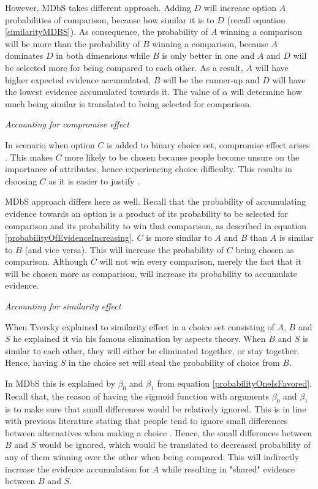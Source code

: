 \documentclass[a4paper,12pt]{article}
\newcommand{\citeyearonly}[1]{\citeyearpar{#1}}
\begin{document}
However, MDbS takes different approach. Adding $D$ will increase option $A$ probabilities of comparison, because how similar it is to $D$ (recall equation \ref{similarityMDBS}). As consequence, the probability of $A$ winning a comparison will be more than the probability of $B$ winning a comparison, because $A$ dominates $D$ in both dimensions while $B$ is only better in one and $A$ and $D$ will be selected more for being  compared to each other. As a result, $A$ will have higher expected evidence accumulated, $B$ will be the runner-up and $D$ will have the lowest evidence accumulated towards it. The value of $\alpha$ will determine how much being similar is translated to being selected for comparison.

\textit{Accounting for compromise effect}

In scenario when option $C$ is added to binary choice set, compromise effect arises \citep{simonson89}. This makes $C$ more likely to be chosen because people become unsure on the importance of attributes, hence experiencing choice difficulty. This results in choosing $C$ as it is easier to justify \citep{simonson89}. 

MDbS approach differs here as well. Recall that the probability of accumulating evidence towards an option is a product of its probability to be selected for comparison and its probability to win that comparison, as described in equation \ref{probabilityOfEvidenceIncreasing}. $C$ is more similar to $A$ and $B$ than $A$ is similar to $B$ (and vice versa). This will increase the probability of $C$ being chosen as comparison. Although $C$ will not win every comparison, merely the fact that it will be chosen more as comparison, will increase its probability to accumulate evidence.

\textit{Accounting for similarity effect}

When Tversky \citeyearonly{tversky1972elimination} explained to similarity effect in a choice set consisting of $A$, $B$ and $S$ he explained it via his famous elimination by aspects theory. When $B$ and $S$ is similar to each other, they will either be eliminated together, or stay together. Hence, having $S$ in the choice set will steal the probability of choice from $B$.

In MDbS this is explained by $\beta_0$ and $\beta_1$ from equation \ref{probabilityOneIsFavored}. Recall that, the reason of having the sigmoid function with arguments $\beta_0$ and $\beta_1$ is to make sure that small differences would be relatively ignored. This is in line with previous literature stating that people tend to ignore small differences between alternatives when making a choice \citep{kalwani1992consumer}. Hence, the small differences between $B$ and $S$ would be ignored, which would be translated to decreased probability of any of them winning over the other when being compared. This will indirectly increase the evidence accumulation for $A$ while resulting in "shared" evidence between $B$ and $S$.
\end{document}
